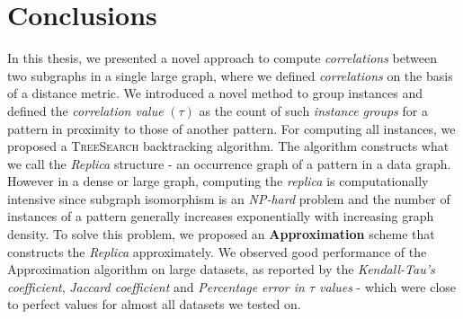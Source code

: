 \chapter{Conclusions}
\label{sec:conclusions}
In this thesis, we presented a novel approach to compute \textit{correlations}
between two subgraphs in a single large graph, where we defined
\textit{correlations} on the basis of a distance metric. We introduced a novel
method to group instances and defined the \textit{correlation value} $(\tau)$ as
the count of such \textit{instance groups} for a pattern in proximity to those
of another pattern. For computing all instances, we proposed a
\textsc{TreeSearch} backtracking algorithm. The algorithm constructs what we
call the \textit{Replica} structure - an occurrence graph of a pattern in a data
graph. However in a dense or large graph, computing the \textit{replica} is
computationally intensive since subgraph isomorphism is an \textit{NP-hard}
problem and the number of instances of a pattern generally increases
exponentially with increasing graph density. To solve this problem, we proposed
an \textbf{Approximation} scheme that constructs the \textit{Replica} approximately. We
observed good performance of the Approximation algorithm on large datasets, as
reported by the \textit{Kendall-Tau's coefficient}, \textit{Jaccard coefficient}
and \textit{Percentage error in $\tau$ values} - which were close to perfect
values for almost all datasets we tested on. 